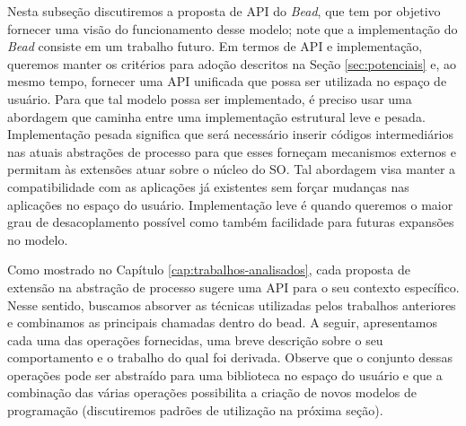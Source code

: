 Nesta subseção discutiremos a proposta de API do \emph{Bead}, que tem por
objetivo fornecer uma visão do funcionamento desse modelo; note que a
implementação do \emph{Bead} consiste em um trabalho futuro. Em termos de API e
implementação, queremos manter os critérios para adoção descritos na Seção
\ref{sec:potenciais} e, ao mesmo tempo, fornecer uma API unificada que possa
ser utilizada no espaço de usuário. Para que tal modelo possa ser implementado,
é preciso usar uma abordagem que caminha entre uma implementação estrutural
leve e pesada.  Implementação pesada significa que será necessário inserir
códigos intermediários nas atuais abstrações de processo para que esses
forneçam mecanismos externos e permitam às extensões atuar sobre o núcleo do
SO. Tal abordagem visa manter a compatibilidade com as aplicações já existentes
sem forçar mudanças nas aplicações no espaço do usuário. Implementação leve é
quando queremos o maior grau de desacoplamento possível como também facilidade
para futuras expansões no modelo.

Como mostrado no Capítulo \ref{cap:trabalhos-analisados}, cada proposta de
extensão na abstração de processo sugere uma API para o seu contexto
específico. Nesse sentido, buscamos absorver as técnicas utilizadas pelos
trabalhos anteriores e combinamos as principais chamadas dentro do bead. A
seguir, apresentamos cada uma das operações fornecidas, uma breve descrição sobre o seu
comportamento e o trabalho do qual foi derivada. Observe que o conjunto dessas
operações pode ser abstraído para uma biblioteca no espaço do usuário e que a
combinação das várias operações possibilita a criação de novos modelos de
programação (discutiremos padrões de utilização na próxima seção). 

